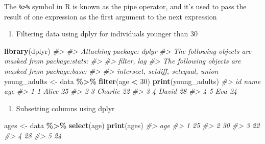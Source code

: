 \documentclass[
]{book}
\newenvironment{Shaded}{\begin{snugshade}}{\end{snugshade}}
\newcommand{\CommentTok}[1]{\textcolor[rgb]{0.56,0.35,0.01}{\textit{#1}}}
\newcommand{\DecValTok}[1]{\textcolor[rgb]{0.00,0.00,0.81}{#1}}
\newcommand{\FunctionTok}[1]{\textcolor[rgb]{0.13,0.29,0.53}{\textbf{#1}}}
\newcommand{\NormalTok}[1]{#1}
\newcommand{\OtherTok}[1]{\textcolor[rgb]{0.56,0.35,0.01}{#1}}
\newcommand{\SpecialCharTok}[1]{\textcolor[rgb]{0.81,0.36,0.00}{\textbf{#1}}}
\providecommand{\tightlist}{%
  \setlength{\itemsep}{0pt}\setlength{\parskip}{0pt}}
\begin{document}
The \texttt{\%\textgreater{}\%} symbol in R is known as the pipe operator, and it's used to pass the result of one expression as the first argument to the next expression

\begin{enumerate}
\def\labelenumi{\arabic{enumi}.}
\tightlist
\item
  Filtering data using dplyr for individuals younger than 30
\end{enumerate}

\begin{Shaded}
\begin{Highlighting}[]
\FunctionTok{library}\NormalTok{(dplyr)}
\CommentTok{\#\textgreater{} }
\CommentTok{\#\textgreater{} Attaching package: \textquotesingle{}dplyr\textquotesingle{}}
\CommentTok{\#\textgreater{} The following objects are masked from \textquotesingle{}package:stats\textquotesingle{}:}
\CommentTok{\#\textgreater{} }
\CommentTok{\#\textgreater{}     filter, lag}
\CommentTok{\#\textgreater{} The following objects are masked from \textquotesingle{}package:base\textquotesingle{}:}
\CommentTok{\#\textgreater{} }
\CommentTok{\#\textgreater{}     intersect, setdiff, setequal, union}
\NormalTok{young\_adults }\OtherTok{\textless{}{-}}\NormalTok{ data }\SpecialCharTok{\%\textgreater{}\%} \FunctionTok{filter}\NormalTok{(age }\SpecialCharTok{\textless{}} \DecValTok{30}\NormalTok{)}
\FunctionTok{print}\NormalTok{(young\_adults)}
\CommentTok{\#\textgreater{}   id    name age}
\CommentTok{\#\textgreater{} 1  1   Alice  25}
\CommentTok{\#\textgreater{} 2  3 Charlie  22}
\CommentTok{\#\textgreater{} 3  4   David  28}
\CommentTok{\#\textgreater{} 4  5     Eva  24}
\end{Highlighting}
\end{Shaded}

\begin{enumerate}
\def\labelenumi{\arabic{enumi}.}
\setcounter{enumi}{1}
\tightlist
\item
  Subsetting columns using dplyr
\end{enumerate}

\begin{Shaded}
\begin{Highlighting}[]
\NormalTok{ages }\OtherTok{\textless{}{-}}\NormalTok{ data }\SpecialCharTok{\%\textgreater{}\%} \FunctionTok{select}\NormalTok{(age)}
\FunctionTok{print}\NormalTok{(ages)}
\CommentTok{\#\textgreater{}   age}
\CommentTok{\#\textgreater{} 1  25}
\CommentTok{\#\textgreater{} 2  30}
\CommentTok{\#\textgreater{} 3  22}
\CommentTok{\#\textgreater{} 4  28}
\CommentTok{\#\textgreater{} 5  24}
\end{Highlighting}
\end{Shaded}
\end{document}
